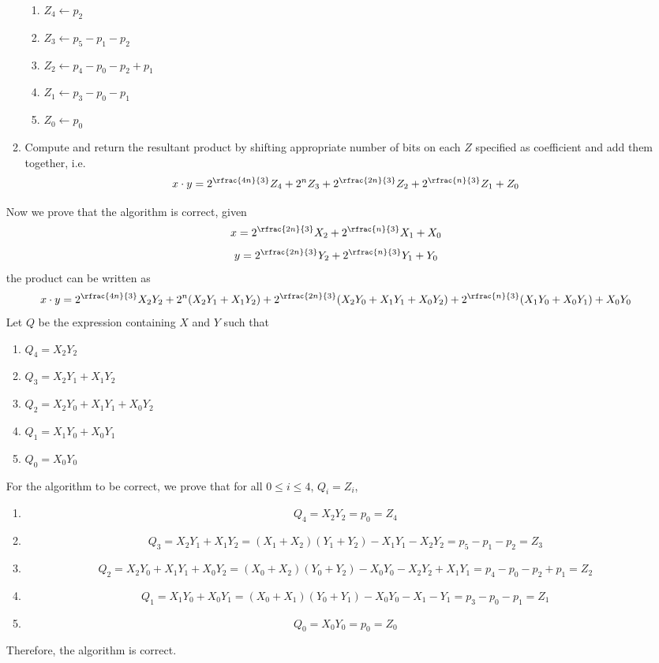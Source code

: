 \documentclass[11pt]{article}
\begin{document}
\begin{enumerate}
\begin{solution}
\begin{enumerate}
      \begin{enumerate}
        \item $Z_4 \leftarrow p_2$
        \item $Z_3 \leftarrow p_5 - p_1 - p_2$
        \item $Z_2 \leftarrow p_4 - p_0 - p_2 + p_1$
        \item $Z_1 \leftarrow p_3 - p_0 - p_1$
        \item $Z_0 \leftarrow p_0$
      \end{enumerate}
      \item Compute and return the resultant product by shifting appropriate number of bits on each $Z$ specified as coefficient and add them together, i.e.
      \[
        x\cdot y = 2^{\rfrac{4n}{3}}Z_4 + 2^{n}Z_3 + 2^{\rfrac{2n}{3}}Z_2 + 2^{\rfrac{n}{3}}Z_1 + Z_0
      \]
    \end{enumerate}

    Now we prove that the algorithm is correct, given
    \[
      x = 2^{\rfrac{2n}{3}}X_{2} + 2^{\rfrac{n}{3}}X_{1} + X_{0}
    \]
    \[
      y= 2^{\rfrac{2n}{3}}Y_{2} + 2^{\rfrac{n}{3}}Y_{1} + Y_{0}
    \]
    the product can be written as
    \[
      x\cdot y = 2^{\rfrac{4n}{3}}X_2 Y_2 + 2^{n}(X_2 Y_1 + X_1 Y_2) + 2^{\rfrac{2n}{3}}(X_2 Y_0 + X_1 Y_1 + X_0 Y_2) + 2^{\rfrac{n}{3}}(X_1 Y_0 + X_0 Y_1) + X_0 Y_0
    \]
    Let $Q$ be the expression containing $X$ and $Y$ such that
    \begin{enumerate}
      \item $Q_4 = X_2 Y_2$
      \item $Q_3 = X_2 Y_1 + X_1 Y_2$
      \item $Q_2 = X_2 Y_0 + X_1 Y_1 + X_0 Y_2$
      \item $Q_1 = X_1 Y_0 + X_0 Y_1$
      \item $Q_0 = X_0 Y_0$
    \end{enumerate}
    For the algorithm to be correct, we prove that for all $0\leq i \leq 4$, $Q_i = Z_i$,
    \begin{enumerate}
      \item
      \[
        Q_4 = X_2 Y_2 = p_0 = Z_4
      \]
      \item
      \[
        Q_3 = X_2 Y_1 + X_1 Y_2 = (X_1 + X_2)(Y_1 + Y_2) - X_1 Y_1 - X_2 Y_2 = p_5 - p_1 - p_2 = Z_3
      \]
      \item
      \[
        Q_2 =  X_2 Y_0 + X_1 Y_1 + X_0 Y_2 = (X_0 + X_2)(Y_0 + Y_2) - X_0 Y_0 - X_2 Y_2 + X_1 Y_1 = p_4 - p_0 - p_2 + p_1 = Z_2
      \]
      \item
      \[
        Q_1 = X_1 Y_0 + X_0 Y_1 = (X_0 + X_1)(Y_0 + Y_1) - X_0 Y_0 - X_1 - Y_1 = p_3 - p_0 - p_1 = Z_1
      \]
      \item
      \[
        Q_0 = X_0 Y_0 = p_0 = Z_0
      \]
    \end{enumerate}
    Therefore, the algorithm is correct.


\end{solution}
\end{enumerate}
\end{document}
